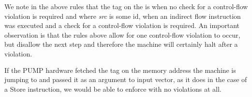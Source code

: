 We note in the above rules that the tag on the \PCname is \DATAname when
no check for a control-flow violation is required and  where
\textit{src} is some id, when an indirect flow instruction was executed and a
check for a control-flow violation is required. An important observation is that
the rules above allow for one control-flow violation to occur, but disallow the
next step and therefore the machine will certainly halt after a violation.

If the PUMP hardware fetched the tag on the memory address the machine is
jumping to and passed it as an argument to input vector, as it does in the
case of a Store instruction, we would be able to enforce \CFI with no violations
at all. 






